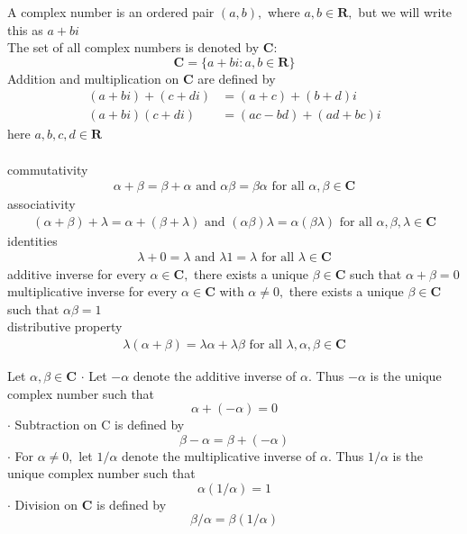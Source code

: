 
A complex number is an ordered pair $(a, b),$ where $a, b \in \mathbf{R},$ but we will write this as $a+b i$ \\
The set of all complex numbers is denoted by $\mathbf{C}:$
$$
\mathbf{C}=\{a+b i: a, b \in \mathbf{R}\}
$$
Addition and multiplication on $\mathbf{C}$ are defined by
$$
\begin{aligned}
(a+b i)+(c+d i) &=(a+c)+(b+d) i \\
(a+b i)(c+d i) &=(a c-b d)+(a d+b c) i
\end{aligned}
$$
here $a, b, c, d \in \mathbf{R}$ \\

 \\
commutativity
\begin{align*}
\alpha+\beta=\beta+\alpha \text { and } \alpha \beta=\beta \alpha \text { for all } \alpha, \beta \in \mathbf{C}
\end{align*}
associativity
\begin{align*}
(\alpha+\beta)+\lambda=\alpha+(\beta+\lambda) \text { and }(\alpha \beta) \lambda=\alpha(\beta \lambda) \text { for all } \alpha, \beta, \lambda \in \mathbf{C}
\end{align*}
identities
\begin{align*}
\lambda+0=\lambda \text { and } \lambda 1=\lambda \text { for all } \lambda \in \mathbf{C}
\end{align*}
additive inverse for every $\alpha \in \mathbf{C},$ there exists a unique $\beta \in \mathbf{C}$ such that $\alpha+\beta=0$ \\
multiplicative inverse for every $\alpha \in \mathbf{C}$ with $\alpha \neq 0,$ there exists a unique $\beta \in \mathbf{C}$ such that $\alpha \beta=1$ \\
distributive property
\begin{align*}
\lambda(\alpha+\beta)=\lambda \alpha+\lambda \beta \text { for all } \lambda, \alpha, \beta \in \mathbf{C}
\end{align*}

Let $\alpha, \beta \in \mathbf{C}$
$\cdot$ Let $-\alpha$ denote the additive inverse of $\alpha .$ Thus $-\alpha$ is the unique complex number such that
$$
\alpha+(-\alpha)=0
$$
$\cdot$ Subtraction on $\mathrm{C}$ is defined by
$$
\beta-\alpha=\beta+(-\alpha)
$$
$\cdot$ For $\alpha \neq 0,$ let $1 / \alpha$ denote the multiplicative inverse of $\alpha .$ Thus $1 / \alpha$ is the unique complex number such that
$$
\alpha(1 / \alpha)=1
$$
$\cdot$ Division on $\mathbf{C}$ is defined by
$$
\beta / \alpha=\beta(1 / \alpha)
$$

